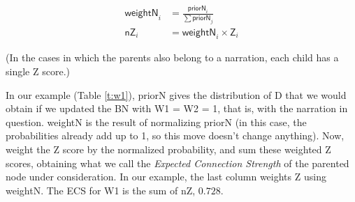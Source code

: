 \documentclass[10pt,]{scrartcl}
\newcommand{\s}[1]{\mbox{\textsf{#1}}}
\begin{document}
 \begin{align*}
    \mathsf{weightN}_i & = \frac{\mathsf{priorN}_i}{\sum \mathsf{priorN}_j}\\
    \mathsf{nZ}_{i} & = \mathsf{weightN}_i \times \mathsf{Z}_i
 \end{align*}
 
 
 \noindent (In  the cases in which the parents also belong to a narration,  each child has a single \s{Z} score.) 

 




 In our example (Table \ref{t:w1}), \textsf{priorN} gives the distribution of \textsf{D} that we would obtain if we updated the BN with \textsf{W1} = \textsf{W2} = 1, that is, with the narration in question.  \textsf{weightN} is the result of normalizing \textsf{priorN} (in this case, the probabilities already add up to 1, so this move doesn't change anything). Now, weight the Z score by the normalized probability, and sum these weighted Z scores, obtaining what we call the \emph{Expected Connection Strength} of the parented node under consideration.   In our example, the last column weights \textsf{Z} using  \textsf{weightN}. The \textsf{ECS} for \textsf{W1} is the sum of \textsf{nZ}, $0.728$.
\end{document}
